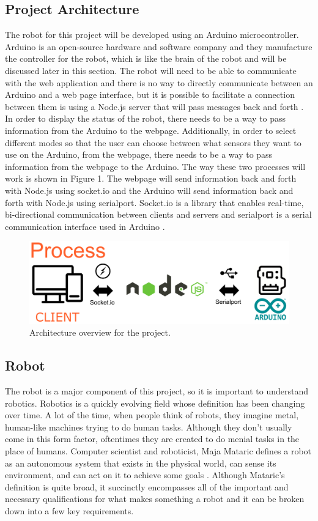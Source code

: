 \documentclass[10pt,twocolumn]{article}
\begin{document}
\subsection{Project Architecture}
The robot for this project will be developed using an Arduino microcontroller. Arduino is an open-source hardware and software company and they manufacture the controller for the robot, which is like the brain of the robot and will be discussed later in this section. The robot will need to be able to communicate with the web application and there is no way to directly communicate between an Arduino and a web page interface, but it is possible to facilitate a connection between them is using a Node.js server that will pass messages back and forth \cite{Thomas2020Communicating}. In order to display the status of the robot, there needs to be a way to pass information from the Arduino to the webpage. Additionally, in order to select different modes so that the user can choose between what sensors they want to use on the Arduino, from the webpage, there needs to be a way to pass information from the webpage to the Arduino. The way these two processes will work is shown in Figure 1. The webpage will send information  back and forth with Node.js using socket.io and the Arduino will send information back and forth with Node.js using serialport. Socket.io is a library that enables real-time, bi-directional communication between clients and servers and serialport is a serial communication interface used in Arduino \cite{Fitzgerald2015Arduino}.

\begin{figure}
    \centering
    \includegraphics[width=.95\linewidth]{Figure 1.png}
    \caption{
        Architecture overview for the project.
    }
    \label{fig:fig1}
\end{figure}

\subsection{Robot}
The robot is a major component of this project, so it is important to understand robotics. Robotics is a quickly evolving field whose definition has been changing over time. A lot of the time, when people think of robots, they imagine metal, human-like machines trying to do human tasks. Although they don’t usually come in this form factor, oftentimes they are created to do menial tasks in the place of humans. Computer scientist and roboticist, Maja Mataric defines a robot as an autonomous system that exists in the physical world, can sense its environment, and can act on it to achieve some goals \cite{Mataric2007TheRoboticsPrimer}. Although Mataric’s definition is quite broad, it succinctly encompasses all of the important and necessary qualifications for what makes something a robot and it can be broken down into a few key requirements. 
\end{document}
